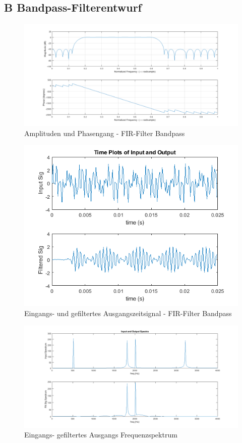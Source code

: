 \clearpage

\subsection{B Bandpass-Filterentwurf}






\begin{figure}[h]
\centering
\includegraphics[width=0.7\linewidth]{./Bilder/Attachment_B_fir_3_Amplitudengang}
\caption{Amplituden und Phasengang - FIR-Filter Bandpass}
\label{fig:Attachment_B_fir_3_Amplitudengang}
\end{figure}

\begin{figure}[h]
\centering
\includegraphics[width=0.7\linewidth]{./Bilder/Attachment_B_fir_3_Timeplot}
\caption{Eingangs- und gefiltertes Ausgangszeitsignal  - FIR-Filter Bandpass}
\label{fig:Attachment_B_fir_3_Timeplot}
\end{figure}

\clearpage

\begin{figure}[h]
\centering
\includegraphics[width=0.7\linewidth]{./Bilder/Attachment_B_fir_3_Spektrum}
\caption{Eingangs- gefiltertes Ausgangs Frequenzspektrum}
\label{fig:Attachment_B_fir_3_Spektrum}
\end{figure}

